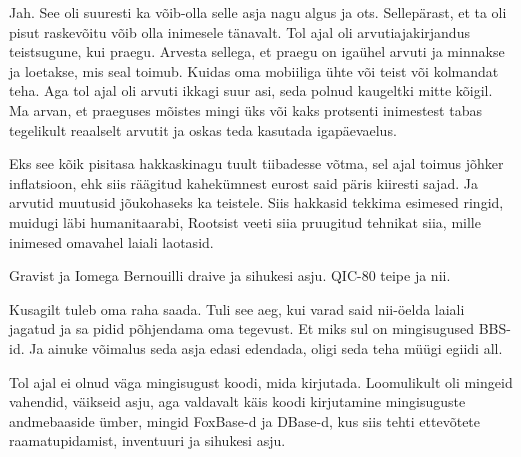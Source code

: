 Jah. See oli suuresti ka võib-olla selle asja nagu algus ja ots. Sellepärast, 
et ta oli pisut raskevõitu võib olla inimesele tänavalt. Tol ajal oli 
arvutiajakirjandus  teistsugune, kui praegu. Arvesta sellega, et praegu on 
igaühel arvuti ja minnakse ja loetakse, mis seal toimub. Kuidas oma mobiiliga 
ühte või teist või kolmandat teha. Aga tol ajal oli arvuti ikkagi suur asi, 
seda polnud kaugeltki mitte kõigil. Ma arvan, et praeguses mõistes mingi üks 
või kaks protsenti inimestest tabas tegelikult reaalselt arvutit ja oskas teda 
kasutada igapäevaelus.
                 

Eks see kõik pisitasa hakkaskinagu tuult tiibadesse võtma, sel ajal toimus 
jõhker inflatsioon, ehk siis räägitud kahekümnest eurost said päris kiiresti 
sajad. Ja arvutid muutusid jõukohaseks ka teistele. Siis hakkasid tekkima 
esimesed ringid, muidugi läbi humanitaarabi, Rootsist veeti siia pruugitud 
tehnikat siia, mille inimesed omavahel laiali laotasid.


Gravist ja Iomega Bernouilli draive ja sihukesi asju. QIC-80 
teipe ja nii.


Kusagilt tuleb oma raha saada. Tuli see aeg, kui varad said nii-öelda laiali 
jagatud ja sa pidid põhjendama oma tegevust. Et miks sul on mingisugused 
BBS-id. Ja ainuke võimalus seda asja edasi edendada, oligi seda teha müügi 
egiidi all.

                 
Tol ajal ei olnud väga mingisugust koodi, mida kirjutada. Loomulikult oli 
mingeid vahendid, väikseid asju, aga valdavalt käis koodi kirjutamine 
mingisuguste andmebaaside ümber, mingid FoxBase-d ja DBase-d, kus siis tehti 
ettevõtete  raamatupidamist,  inventuuri ja sihukesi asju. 

